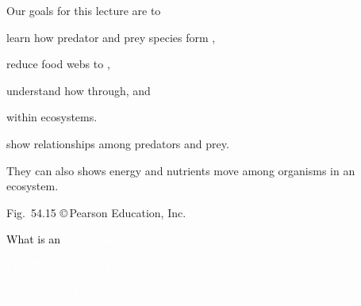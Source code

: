 \documentclass[t]{beamer}
\begin{document}
%
%	
%


\begin{frame}{Our goals for this lecture are to}

	\hangpara learn how predator and prey species form ,

	\hangpara reduce food webs to , 
	
	\hangpara understand how  through, and
	
	\hangpara {} within ecosystems.
	
	
	
\end{frame}
%
{
\begin{frame}{}
\hspace{65mm}\begin{minipage}{0.45\textwidth}
	\flushleft
	\vspace{4\baselineskip}

	 show relationships among predators and prey.
	\vspace{\baselineskip}
	
	They can also shows energy and nutrients move among organisms in an ecosystem.
\end{minipage}

	\vfilll
	
	\hfill \tiny Fig.~54.15 \copyright\,Pearson Education, Inc.
\end{frame}
}
%
{
\begin{frame}[b]{\textcolor{black}{What is an \textcolor{white}{ecosystem?} }}

\tiny \textcolor{white}{Fig.~55.2 \copyright\,Pearson Education, Inc.}
\end{frame}
}
%
{
\begin{frame}[b]

	\hfill \tiny \textcolor{white}{Trey Ratcliff, Flickr }
\end{frame}
}
\end{document}
